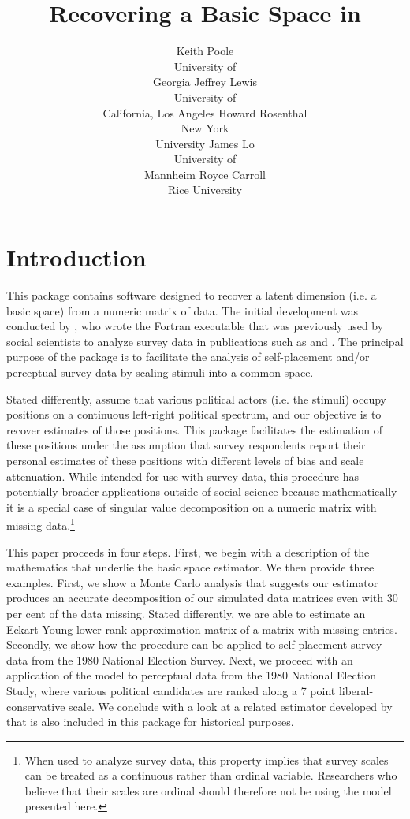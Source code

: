 \documentclass[nojss]{jss}
\author{Keith Poole \\ University of \\ Georgia
  \And
  Jeffrey Lewis \\ University of \\ California, Los Angeles
  \And
  Howard Rosenthal \\ New York\\University
  \And
  James Lo \\ University of \\ Mannheim
  \And
  Royce Carroll \\ Rice University
}
\title{Recovering a Basic Space in \proglang{R}}
\begin{document}


\section{Introduction}


This  \citep{R} package contains software designed to recover a latent dimension (i.e. a basic space)
from a numeric matrix of data. The initial development was conducted by \citet{poole1998recovering}, who wrote the Fortran executable that was previously used by social scientists to analyze survey data in publications such as \citet{palfrey1987relationship} and \citet{saiegh2009recovering}.  The principal purpose of the package is to facilitate the analysis of self-placement and/or perceptual survey data by scaling stimuli into a common space.

Stated differently, assume that various political actors (i.e. the stimuli) occupy positions on a continuous left-right political spectrum, and our objective is to recover estimates of those positions.  This package facilitates the estimation of these positions under the assumption that survey respondents report their personal estimates of these positions with different levels of bias and scale attenuation. While intended for use with survey data, this procedure has potentially broader applications outside of social science because mathematically it is a special case of singular value decomposition on a numeric matrix with missing data.\footnote{When used to analyze survey data, this property implies that survey scales can be treated as a continuous rather than ordinal variable. Researchers who believe that their scales are ordinal should therefore not be using the model presented here.}

This paper proceeds in four steps. First, we begin with a description of the mathematics that underlie the basic space estimator. We then provide three examples. First, we show a Monte Carlo analysis that suggests our estimator produces an accurate decomposition of our simulated data matrices even with 30 per cent of the data missing. Stated differently, we are able to estimate an Eckart-Young lower-rank approximation matrix of a matrix with missing entries.   Secondly, we show how the procedure can be applied to self-placement survey data from the  1980 National Election Survey. Next, we proceed with an application of the model to perceptual data from the 1980 National Election Study, where various political candidates are ranked along a 7 point liberal-conservative scale. We conclude with a look at a related estimator developed by \citet{aldrich1977method} that is also included in this package for historical purposes.
\end{document}
